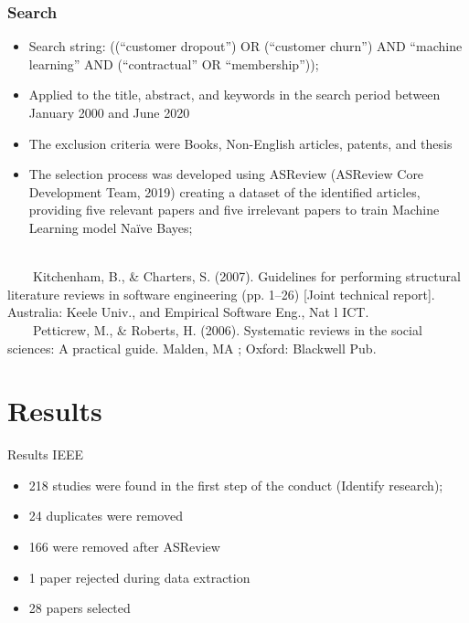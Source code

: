 \documentclass[10pt]{beamer}
\begin{document}
\begin{frame}
	\frametitle{Search }
	\begin{itemize}
		\item Search string: ((“customer dropout”) OR (“customer churn”) AND “machine learning” AND (“contractual” OR “membership”));
		\item Applied to the title, abstract, and keywords in the search period between January 2000 and June 2020
		\item The exclusion criteria were Books, Non-English articles, patents, and thesis
		\item The selection process was developed using ASReview (ASReview Core Development Team, 2019) creating a dataset of the identified articles, providing five relevant papers and five irrelevant papers to train Machine Learning model Naïve Bayes;
		\\~\\
	\end{itemize}
		\tiny 
~~~~Kitchenham, B., \& Charters, S. (2007). Guidelines for performing structural literature reviews in software engineering (pp. 1–26) [Joint technical report]. Australia: Keele Univ., and Empirical Software Eng., Nat l ICT.\\
~~~~Petticrew, M., \& Roberts, H. (2006). Systematic reviews in the social sciences: A practical guide. Malden, MA ; Oxford: Blackwell Pub.\\
\end{frame}


\section{Results}

\begin{frame}[fragile]{Results IEEE}
  	\begin{itemize}
		\item 218 studies were found in the first step of the conduct (Identify research);
		\item 24 duplicates were removed
		\item 166 were removed after ASReview
		\item 1 paper rejected during data extraction
		\item 28 papers selected
	\end{itemize}
\end{frame}
\end{document}
